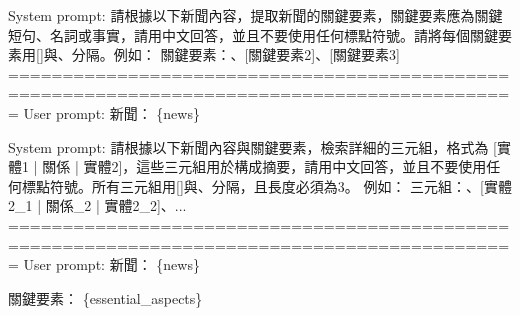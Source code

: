 \noindent
\begin{tcolorbox}[promptstyle, title=Prompt for generating V2 essential aspects]
System prompt:\newline
請根據以下新聞內容，提取新聞的關鍵要素，關鍵要素應為關鍵短句、名詞或事實，請用中文回答，並且不要使用任何標點符號。請將每個關鍵要素用[]與、分隔。例如：\newline
關鍵要素：\newline
[關鍵要素1]、[關鍵要素2]、[關鍵要素3]\newline
=============================================================================================\newline
User prompt:\newline
新聞：\newline
\{news\}
\end{tcolorbox}
\begin{tcolorbox}[promptstyle, title=Prompt for generating V2 triples, fonttitle=\promptTitleFontSize, fontupper=\promptContentFontSize]
System prompt:\newline
請根據以下新聞內容與關鍵要素，檢索詳細的三元組，格式為 [實體1 | 關係 | 實體2]，這些三元組用於構成摘要，請用中文回答，並且不要使用任何標點符號。所有三元組用[]與、分隔，且長度必須為3。\newline
例如：\newline
三元組：\newline
[實體1\_1 | 關係\_1 | 實體1\_2]、[實體2\_1 | 關係\_2 | 實體2\_2]、...\newline
=============================================================================================\newline
User prompt:\newline
新聞：\newline
\{news\}\newline

關鍵要素：\newline
\{essential\_aspects\}
\end{tcolorbox}

